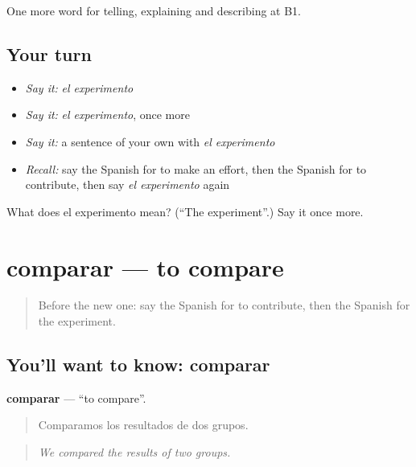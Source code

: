 \begin{grammarlens}[title={What you've built}]
One more word for telling, explaining and describing at B1.
\end{grammarlens}

\subsection*{Your turn}
\begin{itemize}
\raggedright
  \item \emph{Say it:} \emph{el experimento}
  \item \emph{Say it:} \emph{el experimento}, once more
  \item \emph{Say it:} a sentence of your own with \emph{el experimento}
  \item \emph{Recall:} say the Spanish for to make an effort, then the Spanish for to contribute, then say \emph{el experimento} again
\end{itemize}

\begin{tcolorbox}[breakable,colback=teal!4,colframe=teal!35!black,title={Before you move on}]
What does el experimento mean? (\textquotedblleft{}The experiment\textquotedblright{}.) Say it once more.
\end{tcolorbox}
\section[comparar]{comparar — to compare}

\label{lesson:ES-C599-comparar}



\begin{quote}
Before the new one: say the Spanish for to contribute, then the Spanish for the experiment.
\end{quote}

\subsection*{You'll want to know: comparar}
\textbf{comparar} — \textquotedblleft{}to compare\textquotedblright{}.

\begin{quote}
Comparamos los resultados de dos grupos.
\end{quote}

\begin{quote}
\emph{We compared the results of two groups.}
\end{quote}


